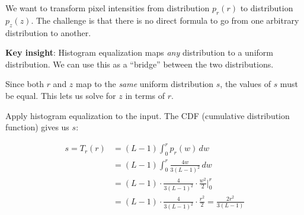 \documentclass[12pt]{article}
\begin{document}
\begin{stepbox}

We want to transform pixel intensities from distribution $p_r(r)$ to distribution $p_z(z)$. The challenge is that there is no direct formula to go from one arbitrary distribution to another.

\vspace{0.2cm}

\textbf{Key insight}: Histogram equalization maps \textit{any} distribution to a uniform distribution. We can use this as a ``bridge'' between the two distributions.

\begin{center}
\end{center}

Since both $r$ and $z$ map to the \textit{same} uniform distribution $s$, the values of $s$ must be equal. This lets us solve for $z$ in terms of $r$.

\end{stepbox}

\begin{stepbox}

Apply histogram equalization to the input. The CDF (cumulative distribution function) gives us $s$:

\begin{align*}
s = T_r(r) &= (L-1) \int_0^r p_r(w)\,dw \\[0.5em]
&= (L-1) \int_0^r \frac{4w}{3(L-1)^2}\,dw \\[0.5em]
&= (L-1) \cdot \frac{4}{3(L-1)^2} \cdot \frac{w^2}{2} \Big|_0^r \\[0.5em]
&= (L-1) \cdot \frac{4}{3(L-1)^2} \cdot \frac{r^2}{2} = \boxed{\frac{2r^2}{3(L-1)}}
\end{align*}

\end{stepbox}
\end{document}
